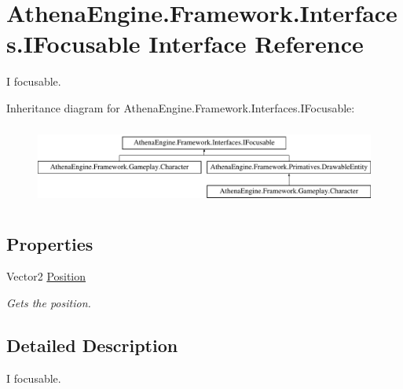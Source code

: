 \hypertarget{interface_athena_engine_1_1_framework_1_1_interfaces_1_1_i_focusable}{\section{Athena\-Engine.\-Framework.\-Interfaces.\-I\-Focusable Interface Reference}
\label{interface_athena_engine_1_1_framework_1_1_interfaces_1_1_i_focusable}
}


I focusable.  


Inheritance diagram for Athena\-Engine.\-Framework.\-Interfaces.\-I\-Focusable\-:\begin{figure}[H]
\begin{center}
\leavevmode
\includegraphics[height=2.649842cm]{interface_athena_engine_1_1_framework_1_1_interfaces_1_1_i_focusable}
\end{center}
\end{figure}
\subsection*{Properties}
\begin{DoxyCompactItemize}
\item 
Vector2 \hyperlink{interface_athena_engine_1_1_framework_1_1_interfaces_1_1_i_focusable_a9520d4dbfc7b7ace27aec2dfce79050b}{Position}
\begin{DoxyCompactList}\small\item\em Gets the position. \end{DoxyCompactList}\end{DoxyCompactItemize}


\subsection{Detailed Description}
I focusable. 



